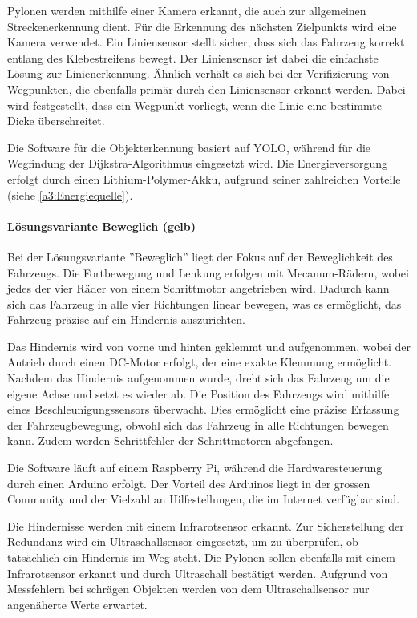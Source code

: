 \documentclass[../main.tex]{subfiles}
\begin{document}
    Pylonen werden mithilfe einer Kamera erkannt, die auch zur allgemeinen Streckenerkennung dient. Für die Erkennung des nächsten Zielpunkts wird eine Kamera verwendet. Ein Liniensensor stellt sicher, dass sich das Fahrzeug korrekt entlang des Klebestreifens bewegt. Der Liniensensor ist dabei die einfachste Lösung zur Linienerkennung. Ähnlich verhält es sich bei der Verifizierung von Wegpunkten, die ebenfalls primär durch den Liniensensor erkannt werden. Dabei wird festgestellt, dass ein Wegpunkt vorliegt, wenn die Linie eine bestimmte Dicke überschreitet. 

    Die Software für die Objekterkennung basiert auf YOLO, während für die Wegfindung der Dijkstra-Algorithmus eingesetzt wird. Die Energieversorgung erfolgt durch einen Lithium-Polymer-Akku, aufgrund seiner zahlreichen Vorteile (siehe \ref{a3:Energiequelle}).
    
    \newpage
    
    \paragraph{Lösungsvariante Beweglich (gelb)}
    Bei der Lösungsvariante ''Beweglich'' liegt der Fokus auf der Beweglichkeit des Fahrzeugs. Die Fortbewegung und Lenkung erfolgen mit Mecanum-Rädern, wobei jedes der vier Räder von einem Schrittmotor angetrieben wird. Dadurch kann sich das Fahrzeug in alle vier Richtungen linear bewegen, was es ermöglicht, das Fahrzeug präzise auf ein Hindernis auszurichten.

    Das Hindernis wird von vorne und hinten geklemmt und aufgenommen, wobei der Antrieb durch einen DC-Motor erfolgt, der eine exakte Klemmung ermöglicht. Nachdem das Hindernis aufgenommen wurde, dreht sich das Fahrzeug um die eigene Achse und setzt es wieder ab. Die Position des Fahrzeugs wird mithilfe eines Beschleunigungssensors überwacht. Dies ermöglicht eine präzise Erfassung der Fahrzeugbewegung, obwohl sich das Fahrzeug in alle Richtungen bewegen kann. Zudem werden Schrittfehler der Schrittmotoren abgefangen.

    Die Software läuft auf einem Raspberry Pi, während die Hardwaresteuerung durch einen Arduino erfolgt. Der Vorteil des Arduinos liegt in der grossen Community und der Vielzahl an Hilfestellungen, die im Internet verfügbar sind.

    Die Hindernisse werden mit einem Infrarotsensor erkannt. Zur Sicherstellung der Redundanz wird ein Ultraschallsensor eingesetzt, um zu überprüfen, ob tatsächlich ein Hindernis im Weg steht. Die Pylonen sollen ebenfalls mit einem Infrarotsensor erkannt und durch Ultraschall bestätigt werden. Aufgrund von Messfehlern bei schrägen Objekten werden von dem Ultraschallsensor nur angenäherte Werte erwartet.
\end{document}
